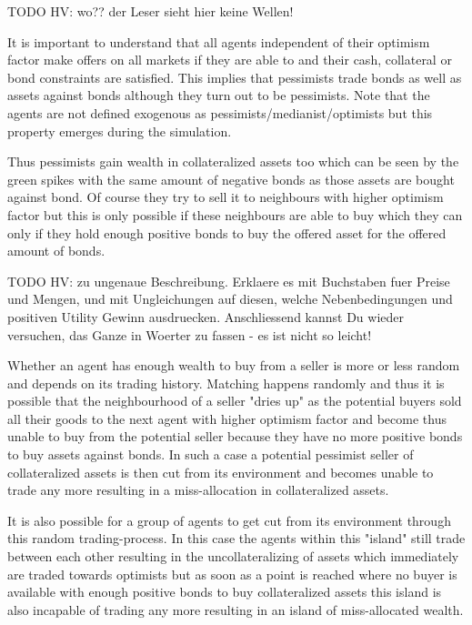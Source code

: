 \documentclass[Bachelorarbeit.tex]{subfiles}
\begin{document}
TODO HV: wo?? der Leser sieht hier keine Wellen!

\medskip 

It is important to understand that all agents independent of their optimism factor make offers on all markets if they are able to and their cash, collateral or bond constraints are satisfied. This implies that pessimists trade bonds as well as assets against bonds although they turn out to be pessimists. Note that the agents are not defined exogenous as pessimists/medianist/optimists but this property emerges during the simulation.

\medskip 

Thus pessimists gain wealth in collateralized assets too which can be seen by the green spikes with the same amount of negative bonds as those assets are bought against bond. Of course they try to sell it to neighbours with higher optimism factor but this is only possible if these neighbours are able to buy which they can only if they hold enough positive bonds to buy the offered asset for the offered amount of bonds.

TODO HV: zu ungenaue Beschreibung. Erklaere es mit Buchstaben fuer Preise und Mengen, und mit Ungleichungen auf diesen, welche Nebenbedingungen und positiven Utility Gewinn ausdruecken. Anschliessend kannst Du wieder versuchen, das Ganze in Woerter zu fassen - es ist nicht so leicht!

\medskip 

Whether an agent has enough wealth to buy from a seller is more or less random and depends on its trading history. Matching happens randomly and thus it is possible that the neighbourhood of a seller "dries up" as the potential buyers sold all their goods to the next agent with higher optimism factor and become thus unable to buy from the potential seller because they have no more positive bonds to buy assets against bonds. In such a case a potential pessimist seller of collateralized assets is then cut from its environment and becomes unable to trade any more resulting in a miss-allocation in collateralized assets.

\medskip 

It is also possible for a group of agents to get cut from its environment through this random trading-process. In this case the agents within this "island" still trade between each other resulting in the uncollateralizing of assets which immediately are traded towards optimists but as soon as a point is reached where no buyer is available with enough positive bonds to buy collateralized assets this island is also incapable of trading any more resulting in an island of miss-allocated wealth.
\end{document}
